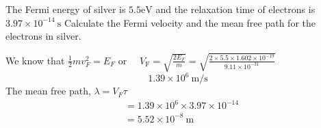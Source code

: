 \begin{exercise}
	 The Fermi energy of silver is  $5.5 \mathrm{eV}$ and the relaxation time of electrons is $3.97 \times 10^{-14} \mathrm{~s}$  Calculate the Fermi velocity and the mean free path for the electrons in silver.
\end{exercise}
\begin{answer}
	We know that $\frac{1}{2} m v_{F}^{2}=E_{F}$
	or $\quad V_{\mathrm{F}}=\sqrt{\frac{2 E_{F}}{m}}=\sqrt{\frac{2 \times 5.5 \times 1.602 \times 10^{-19}}{9.11 \times 10^{-31}}}$
	$$
	1.39 \times 10^{6} \mathrm{~m} / \mathrm{s}
	$$
	The mean free path, $\lambda=V_{F} \tau$
	$$
	\begin{aligned}
	&=1.39 \times 10^{6} \times 3.97 \times 10^{-14} \\
	&=5.52 \times 10^{-8} \mathrm{~m}
	\end{aligned}
	$$
\end{answer}

